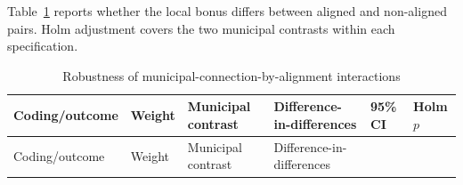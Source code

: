 \documentclass[
  letterpaper,
  DIV=11,
  numbers=noendperiod]{scrartcl}
\begin{document}
Table~\ref{tbl-interaction-robustness} reports whether the local bonus
differs between aligned and non-aligned pairs. Holm adjustment covers
the two municipal contrasts within each specification.

\begin{longtable}[]{@{}
  >{\raggedright\arraybackslash}p{}
  >{\raggedright\arraybackslash}p{}
  >{\raggedright\arraybackslash}p{}
  >{\raggedleft\arraybackslash}p{}
  >{\raggedright\arraybackslash}p{}
  >{\raggedleft\arraybackslash}p{}@{}}
\caption{Robustness of municipal-connection-by-alignment
interactions}\label{tbl-interaction-robustness}\tabularnewline
\toprule\noalign{}
\begin{minipage}[b]{\linewidth}\raggedright
Coding/outcome
\end{minipage} & \begin{minipage}[b]{\linewidth}\raggedright
Weight
\end{minipage} & \begin{minipage}[b]{\linewidth}\raggedright
Municipal contrast
\end{minipage} & \begin{minipage}[b]{\linewidth}\raggedleft
Difference-in-differences
\end{minipage} & \begin{minipage}[b]{\linewidth}\raggedright
95\% CI
\end{minipage} & \begin{minipage}[b]{\linewidth}\raggedleft
Holm \(p\)
\end{minipage} \\
\midrule\noalign{}
\endfirsthead
\toprule\noalign{}
\begin{minipage}[b]{\linewidth}\raggedright
Coding/outcome
\end{minipage} & \begin{minipage}[b]{\linewidth}\raggedright
Weight
\end{minipage} & \begin{minipage}[b]{\linewidth}\raggedright
Municipal contrast
\end{minipage} & \begin{minipage}[b]{\linewidth}\raggedleft
Difference-in-differences
\end{minipage} & \begin{minipage}[b]{\linewidth}\raggedright

\end{minipage}
\end{longtable}
\end{document}
